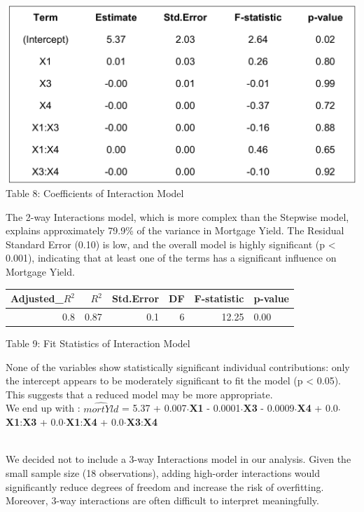 \documentclass[
  12pt,
]{article}
\begin{document}
\begin{minipage}{0.46\textwidth}
\includegraphics[width=1.35\linewidth]{figures/interaction_model_coef.png}
\vspace{-0.3em}
\fontsize{12}{12}\selectfont Table 8: Coefficients of Interaction Model
\end{minipage}
\hfill
\begin{minipage}{0.35\textwidth}
The 2-way Interactions model, which is more complex than the Stepwise
model, explains approximately 79.9\% of the variance in Mortgage Yield.
The Residual Standard Error (0.10) is low, and the overall model is
highly significant (p < 0.001), indicating that at least one of the
terms has a significant influence on Mortgage Yield.
\end{minipage}

\begin{table}[!h]
\centering\begingroup\fontsize{8}{10}\selectfont

\begin{tabular}{rrrrrl}
\toprule
Adjusted\_$R^{2}$ & $R^2$ & Std.Error & DF & F-statistic & p-value\\
\midrule
0.8 & 0.87 & 0.1 & 6 & 12.25 & 0.00\\
\bottomrule
\end{tabular}
\endgroup{}
\end{table}
\begin{center}
\vspace{5em}
{\fontsize{12}{14}\selectfont Table 9: Fit Statistics of Interaction Model\par}
\end{center}

\addtocounter{table}{2}

None of the variables show statistically significant individual
contributions: only the intercept appears to be moderately significant
to fit the model (p \textless{} 0.05). This suggests that a reduced
model may be more appropriate.\\
We end up with : \(\hat{mortYld}\) = 5.37 + 0.007\(\cdot\)\textbf{X1} -
0.0001\(\cdot\)\textbf{X3} - 0.0009\(\cdot\)\textbf{X4} +
0.0\(\cdot\)\textbf{X1}:\textbf{X3} +
0.0\(\cdot\)\textbf{X1}:\textbf{X4} +
0.0\(\cdot\)\textbf{X3}:\textbf{X4}\\
\strut \\
We decided not to include a 3-way Interactions model in our analysis.
Given the small sample size (18 observations), adding high-order
interactions would significantly reduce degrees of freedom and increase
the risk of overfitting. Moreover, 3-way interactions are often
difficult to interpret meaningfully.
\end{document}
